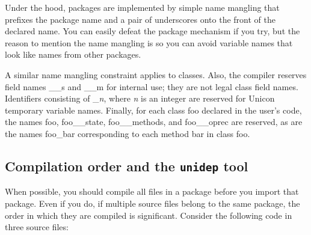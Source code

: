 Under the hood, packages are implemented by simple name mangling that prefixes
the package name and a pair of underscores onto the front of the declared
name. You can easily defeat the package mechanism if you try, but the reason to
mention the name mangling is so you can avoid variable names that look like
names from other packages.

A similar name mangling constraint applies to
classes. Also, the compiler reserves field names \textsf{\_\_s} and
\textsf{\_\_m} for internal use; they are not legal class field names.
Identifiers consisting of \textsf{\_}\textsf{\textit{n}}, where \textit{n}
is an integer are reserved for Unicon temporary variable names. Finally,
for each class \textsf{foo} declared in the user's code, the names
\textsf{foo}, \textsf{foo\_\_state}, \textsf{foo\_\_methods}, and
\textsf{foo\_\_oprec} are reserved, as are the names \textsf{foo\_bar}
corresponding to each method \textsf{bar} in class \textsf{foo}.


\subsection*{Compilation order and the \texttt{unidep} tool}

When possible, you should compile all files in a package before you
import that package. Even if you do, if multiple source files belong to
the same package, the order in which they are compiled is significant.
Consider the following code in three source files:


